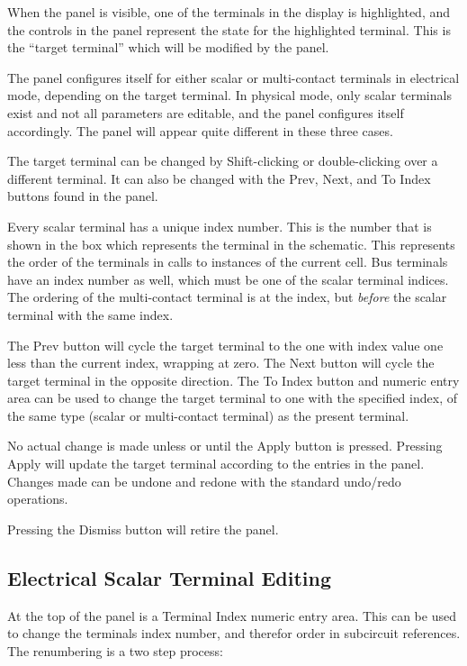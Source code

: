 When the panel is visible, one of the terminals in the display is
highlighted, and the controls in the panel represent the state for the
highlighted terminal.  This is the ``target terminal'' which will be
modified by the panel.

The panel configures itself for either scalar or multi-contact
terminals in electrical mode, depending on the target terminal.  In
physical mode, only scalar terminals exist and not all parameters are
editable, and the panel configures itself accordingly.  The panel will
appear quite different in these three cases.

The target terminal can be changed by {\kb Shift}-clicking or
double-clicking over a different terminal.  It can also be changed
with the {\cb Prev}, {\cb Next}, and {\cb To Index} buttons found in
the panel.

Every scalar terminal has a unique index number.  This is the number
that is shown in the box which represents the terminal in the
schematic.  This represents the order of the terminals in calls to
instances of the current cell.  Bus terminals have an index number as
well, which must be one of the scalar terminal indices.  The ordering
of the multi-contact terminal is at the index, but {\it before} the
scalar terminal with the same index.

The {\cb Prev} button will cycle the target terminal to the one with
index value one less than the current index, wrapping at zero.  The
{\cb Next} button will cycle the target terminal in the opposite
direction.  The {\cb To Index} button and numeric entry area can be
used to change the target terminal to one with the specified index, of
the same type (scalar or multi-contact terminal) as the present
terminal. 

No actual change is made unless or until the {\cb Apply} button is
pressed.  Pressing {\cb Apply} will update the target terminal
according to the entries in the panel.  Changes made can be undone and
redone with the standard {\Xic} undo/redo operations.

Pressing the {\cb Dismiss} button will retire the panel.

\subsection{Electrical Scalar Terminal Editing}

At the top of the panel is a {\cb Terminal Index} numeric entry area. 
This can be used to change the terminals index number, and therefor
order in subcircuit references.  The renumbering is a two step
process:

